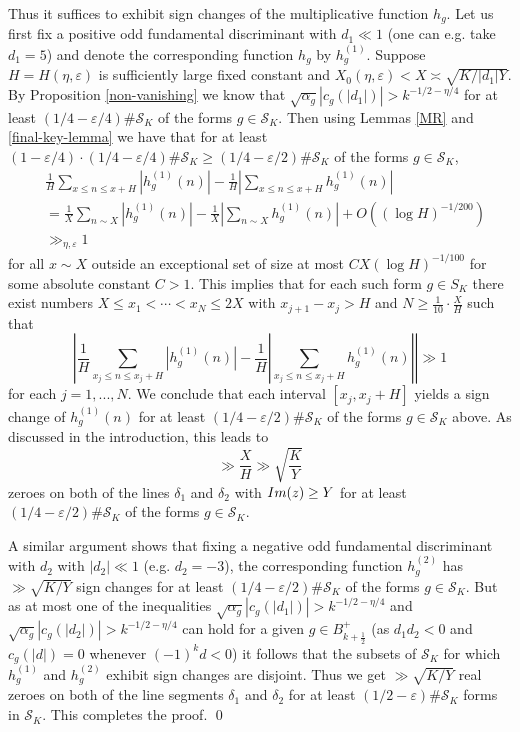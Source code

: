 \documentclass[a4paper,10pt,twoside]{amsart}
\theoremstyle{definition}
\numberwithin{equation}{section}
\newcommand\eps{\varepsilon}
\renewcommand{\Im}{\textnormal{Im}}
\renewcommand\:{\colon}
\begin{document}
Thus it suffices to exhibit sign changes of the multiplicative function $h_g$. Let us first fix a positive odd fundamental discriminant with $d_1\ll 1$ (one can e.g. take $d_1=5$) and denote the corresponding function $h_g$ by $h_g^{(1)}$. Suppose $H=H(\eta,\varepsilon)$ is sufficiently large fixed constant and $X_0(\eta,\varepsilon)<X\asymp\sqrt{K/|d_1|Y}$. By Proposition \ref{non-vanishing} we know that $\sqrt{\alpha_g}|c_g(|d_1|)|>k^{-1/2-\eta/4}$ for at least $(1/4-\eps/4)\#\mathcal S_K$ of the forms $g\in\mathcal S_K$. Then using Lemmas \ref{MR} and \ref{final-key-lemma} we have that for at least $(1-\varepsilon/4)\cdot(1/4-\eps/4)\#\mathcal S_K\geq(1/4-\varepsilon/2)\#\mathcal S_K$ of the forms $g\in \mathcal S_K$,
\begin{align*}
&\frac1H\sum_{x\leq n\leq x+H}|h_g^{(1)}(n)|-\frac1H\left|\sum_{x\leq n\leq x+H}h_g^{(1)}(n)\right|\\
&=\frac1X\sum_{n\sim X}|h_g^{(1)}(n)|-\frac1X\left|\sum_{n\sim X}h_g^{(1)}(n)\right|+O\left((\log H)^{-1/200}\right)\\
&\gg_{\eta,\varepsilon}1
\end{align*}
for all $x\sim X$ outside an exceptional set of size at most $CX(\log H)^{-1/100}$ for some absolute constant $C>1$. This implies that for each such form $g\in S_K$ there exist numbers $X\leq x_1<\cdots <x_N\leq 2X$ with $x_{j+1}-x_j>H$ and $N\geq\frac1{10}\cdot\frac XH$ such that
\[\left|\frac1H\sum_{x_j\leq n\leq x_j+H}|h_g^{(1)}(n)|-\frac1H\left|\sum_{x_j\leq n\leq x_j+H}h_g^{(1)}(n)\right|\right|\gg 1\]
for each $j=1,...,N$. We conclude that each interval $[x_j,x_j+H]$ yields a sign change of $h_g^{(1)}(n)$ for at least $(1/4-\varepsilon/2)\#\mathcal S_K$ of the forms $g\in\mathcal S_K$ above. As discussed in the introduction, this leads to
\[\gg\frac XH\gg\sqrt{\frac KY}\]
zeroes on both of the lines $\delta_1$ and $\delta_2$ with $\Im(z)\geq Y$ for at least $(1/4-\eps/2)\#\mathcal S_K$ of the forms $g\in\mathcal S_K$.

A similar argument shows that fixing a negative odd fundamental discriminant with $d_2$ with $|d_2|\ll 1$ (e.g. $d_2=-3$), the corresponding function $h_g^{(2)}$ has $\gg\sqrt{K/Y}$ sign changes for at least $(1/4-\eps/2)\#\mathcal S_K$ of the forms $g\in\mathcal S_K$. But as at most one of the inequalities $\sqrt{\alpha_g}|c_g(|d_1|)|>k^{-1/2-\eta/4}$ and $\sqrt{\alpha_g}|c_g(|d_2|)|>k^{-1/2-\eta/4}$ can hold for a given $g\in B_{k+\frac12}^+$ (as $d_1d_2<0$ and $c_g(|d|)=0$ whenever $(-1)^k d<0$) it follows that the subsets of $\mathcal S_K$ for which $h_g^{(1)}$ and $h_g^{(2)}$ exhibit sign changes are disjoint. Thus we get $\gg\sqrt{K/Y}$ real zeroes on both of the line segments $\delta_1$ and $\delta_2$ for at least $(1/2-\eps)\#\mathcal S_K$ forms in $\mathcal S_K$. This completes the proof. \qed





\end{document}
